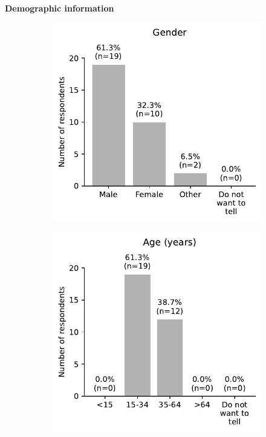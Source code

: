 \begin{appendices}
\begin{minipage}{\textwidth}
\textbf{Demographic information}

\begin{figure}[H]
	\begin{subfigure}[b]{0.5\textwidth}
		\includegraphics[width=\textwidth]{visual/figures/survey/13.pdf}
	\end{subfigure}%
	\hfill
	\begin{subfigure}[b]{0.5\textwidth}
		\includegraphics[width=\textwidth]{visual/figures/survey/14.pdf}
	\end{subfigure}%
\end{figure}
\end{minipage}

\end{appendices}
